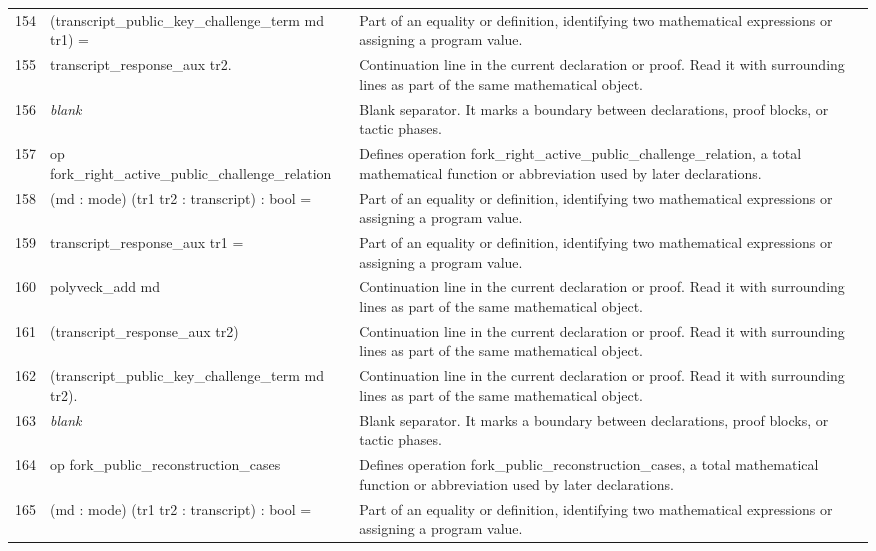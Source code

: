 \documentclass[10pt]{article}
\begin{document}
\begin{longtable}{r L{0.53\textwidth} L{0.37\textwidth}}
154 & {\ttfamily\scriptsize     (transcript\_public\_key\_challenge\_term md tr1) =} & Part of an equality or definition, identifying two mathematical expressions or assigning a program value. \\
155 & {\ttfamily\scriptsize   transcript\_response\_aux tr2.} & Continuation line in the current declaration or proof.  Read it with surrounding lines as part of the same mathematical object. \\
156 & {\ttfamily\scriptsize \emph{blank}} & Blank separator.  It marks a boundary between declarations, proof blocks, or tactic phases. \\
157 & {\ttfamily\scriptsize op fork\_right\_active\_public\_challenge\_relation} & Defines operation fork\_right\_active\_public\_challenge\_relation, a total mathematical function or abbreviation used by later declarations. \\
158 & {\ttfamily\scriptsize    (md : mode) (tr1 tr2 : transcript) : bool =} & Part of an equality or definition, identifying two mathematical expressions or assigning a program value. \\
159 & {\ttfamily\scriptsize   transcript\_response\_aux tr1 =} & Part of an equality or definition, identifying two mathematical expressions or assigning a program value. \\
160 & {\ttfamily\scriptsize   polyveck\_add md} & Continuation line in the current declaration or proof.  Read it with surrounding lines as part of the same mathematical object. \\
161 & {\ttfamily\scriptsize     (transcript\_response\_aux tr2)} & Continuation line in the current declaration or proof.  Read it with surrounding lines as part of the same mathematical object. \\
162 & {\ttfamily\scriptsize     (transcript\_public\_key\_challenge\_term md tr2).} & Continuation line in the current declaration or proof.  Read it with surrounding lines as part of the same mathematical object. \\
163 & {\ttfamily\scriptsize \emph{blank}} & Blank separator.  It marks a boundary between declarations, proof blocks, or tactic phases. \\
164 & {\ttfamily\scriptsize op fork\_public\_reconstruction\_cases} & Defines operation fork\_public\_reconstruction\_cases, a total mathematical function or abbreviation used by later declarations. \\
165 & {\ttfamily\scriptsize    (md : mode) (tr1 tr2 : transcript) : bool =} & Part of an equality or definition, identifying two mathematical expressions or assigning a program value. \\

\end{longtable}
\end{document}

